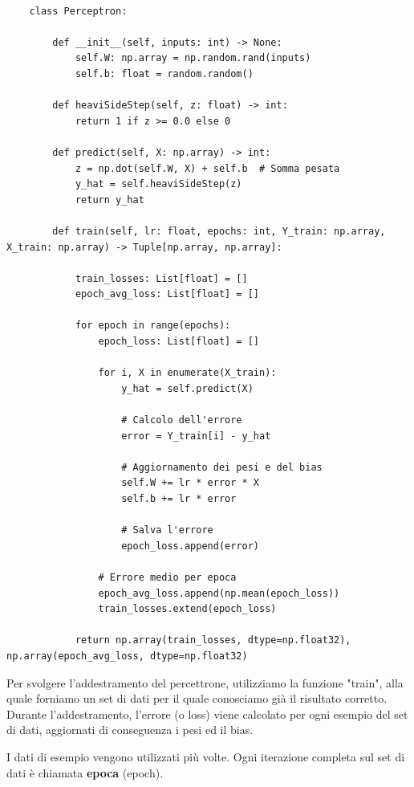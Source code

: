\begin{lstlisting}

    class Perceptron:

        def __init__(self, inputs: int) -> None:
            self.W: np.array = np.random.rand(inputs) 
            self.b: float = random.random()

        def heaviSideStep(self, z: float) -> int:
            return 1 if z >= 0.0 else 0

        def predict(self, X: np.array) -> int:
            z = np.dot(self.W, X) + self.b  # Somma pesata
            y_hat = self.heaviSideStep(z)
            return y_hat
        
        def train(self, lr: float, epochs: int, Y_train: np.array, X_train: np.array) -> Tuple[np.array, np.array]:
        
            train_losses: List[float] = []
            epoch_avg_loss: List[float] = []

            for epoch in range(epochs):
                epoch_loss: List[float] = []

                for i, X in enumerate(X_train):
                    y_hat = self.predict(X)

                    # Calcolo dell'errore
                    error = Y_train[i] - y_hat  

                    # Aggiornamento dei pesi e del bias
                    self.W += lr * error * X
                    self.b += lr * error

                    # Salva l'errore
                    epoch_loss.append(error)

                # Errore medio per epoca
                epoch_avg_loss.append(np.mean(epoch_loss))
                train_losses.extend(epoch_loss)

            return np.array(train_losses, dtype=np.float32), np.array(epoch_avg_loss, dtype=np.float32)
\end{lstlisting}

Per svolgere l'addestramento del percettrone, utilizziamo la funzione "train", alla 
quale forniamo un set di dati per il quale conosciamo già il risultato corretto. Durante 
l'addestramento, l'errore (o loss) viene calcolato per ogni esempio del set di 
dati, aggiornati di conseguenza i pesi ed il bias. 

I dati di esempio vengono utilizzati più volte. Ogni iterazione completa sul set di 
dati è chiamata \textbf{epoca} (epoch).

